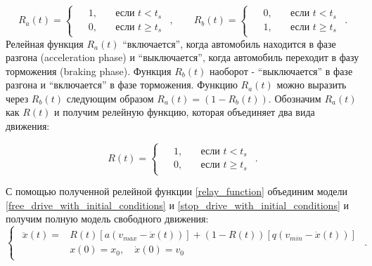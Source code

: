\documentclass[12pt, a4paper]{extarticle}
\numberwithin{equation}{section}
\numberwithin{figure}{section}
\begin{document}
\begin{equation*} 
R_{a}(t)=
\begin{cases}
\begin{split}
&1, \quad&\text{если } t<t_{s} \\
&0, \quad&\text{если } t\geq t_{s}
\end{split}
\end{cases},
\qquad
R_{b}(t)=
\begin{cases}
\begin{split}
&0, \quad&\text{если } t<t_{s} \\
&1, \quad&\text{если } t\geq t_{s}
\end{split}
\end{cases}.
\end{equation*}
Релейная функция $R_{a}(t)$ ``включается'', когда автомобиль находится в фазе разгона (acceleration phase) и ``выключается'', когда автомобиль переходит в фазу торможения (braking phase). Функция $R_{b}(t)$ наоборот - ``выключается'' в фазе разгона и ``включается'' в фазе торможения. Функцию $R_{a}(t)$ можно выразить через $R_{b}(t)$ следующим образом $R_{a}(t) = (1-R_{b}(t))$. Обозначим $R_{a}(t)$ как $R(t)$ и получим релейную функцию, которая объединяет два вида движения:

\begin{equation} \label{relay_function}
R(t)=
\begin{cases}
\begin{split}
&1, \quad&\text{если } t<t_{s} \\
&0, \quad&\text{если } t\geq t_{s}
\end{split}
\end{cases}.
\end{equation}

С помощью полученной релейной функции \eqref{relay_function} объединим модели \eqref{free_drive_with_initial_conditions} и  \eqref{stop_drive_with_initial_conditions} и получим полную модель свободного движения:
\begin{equation} \label{free_drive_model}
\begin{cases}
\begin{split}
\ddot{x}(t) = &R(t) \left[ a\left(v_{max}-\dot{x}(t) \right)\right] + (1-R(t)) \left[ q\left( v_{min} - \dot{x}(t)\right) \right]  \\
&x(0)=x_0, \quad \dot{x}(0)=v_{0}
\end{split}
\end{cases}.
\end{equation}
\end{document}
